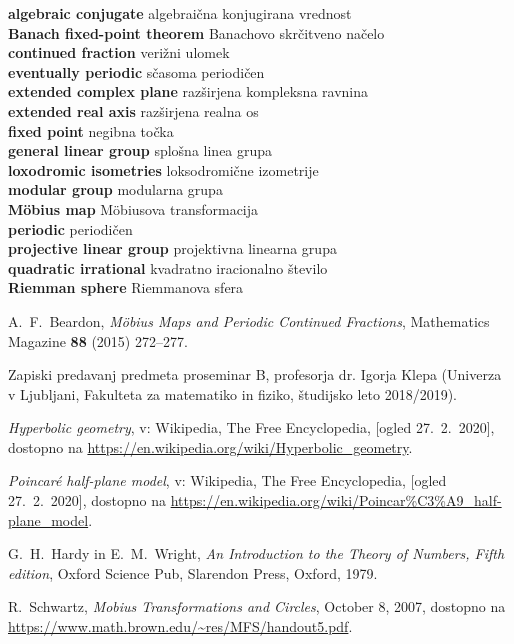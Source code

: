 \documentclass[a4paper,12pt]{article}
\newcommand{\geslo}[2]{\noindent\textbf{#1} \quad \hangindent=1cm #2\\[-1pc]}
\begin{document}
\geslo{algebraic conjugate}{algebraična konjugirana vrednost}

\geslo{Banach fixed-point theorem}{Banachovo skrčitveno načelo}

\geslo{continued fraction}{verižni ulomek}

\geslo{eventually periodic}{sčasoma periodičen}

\geslo{extended complex plane}{razširjena kompleksna ravnina}

\geslo{extended real axis}{razširjena realna os}

\geslo{fixed point}{negibna točka}

\geslo{general linear group}{splošna linea grupa}

\geslo{loxodromic isometries}{loksodromične izometrije}

\geslo{modular group}{modularna grupa}

\geslo{M\"obius map}{M\"obiusova transformacija}

\geslo{periodic}{periodičen}

\geslo{projective linear group}{projektivna linearna grupa}

\geslo{quadratic irrational}{kvadratno iracionalno število}

\geslo{Riemman sphere}{Riemmanova sfera}



\begin{thebibliography}{1}

A.~F.~Beardon, \emph{M\"obius Maps and Periodic Continued Fractions}, Mathematics Magazine \textbf{88} (2015) 272--277.

Zapiski predavanj predmeta proseminar B, profesorja dr. Igorja Klepa (Univerza v Ljubljani, Fakulteta za matematiko in fiziko, študijsko leto 2018/2019).

\emph{Hyperbolic geometry}, v: Wikipedia, The Free Encyclopedia, [ogled 27.~2.~2020], dostopno na \url{https://en.wikipedia.org/wiki/Hyperbolic_geometry}.

\emph{Poincar\'e half-plane model}, v: Wikipedia, The Free Encyclopedia, [ogled 27.~2.~2020], dostopno na \url{https://en.wikipedia.org/wiki/Poincar%C3%A9_half-plane_model}.

G.~H.~Hardy in E.~M.~Wright, \emph{An Introduction to the Theory of Numbers, Fifth edition}, Oxford Science Pub, Slarendon Press, Oxford, 1979.

R.~Schwartz, \emph{Mobius Transformations and Circles}, October 8, 2007, dostopno na \url{https://www.math.brown.edu/~res/MFS/handout5.pdf}.

\end{thebibliography}
\end{document}
